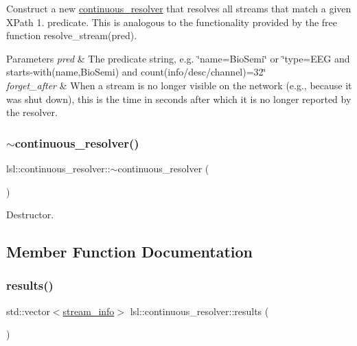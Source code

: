 Construct a new \hyperlink{classlsl_1_1continuous__resolver}{continuous\+\_\+resolver} that resolves all streams that match a given X\+Path 1. predicate. This is analogous to the functionality provided by the free function resolve\+\_\+stream(pred). 
\begin{DoxyParams}{Parameters}
{\em pred} & The predicate string, e.\+g. \char`\"{}name=\textquotesingle{}\+Bio\+Semi\textquotesingle{}\char`\"{} or \char`\"{}type=\textquotesingle{}\+E\+E\+G\textquotesingle{} and starts-\/with(name,\textquotesingle{}\+Bio\+Semi\textquotesingle{}) and count(info/desc/channel)=32\char`\"{} \\
\hline
{\em forget\+\_\+after} & When a stream is no longer visible on the network (e.\+g., because it was shut down), this is the time in seconds after which it is no longer reported by the resolver. \\
\hline
\end{DoxyParams}
\mbox{\label{classlsl_1_1continuous__resolver_a382bc439e5dbb1efcaa32def93ef01df}} 
\subsubsection{\texorpdfstring{$\sim$continuous\+\_\+resolver()}{~continuous\_resolver()}}
{\footnotesize\ttfamily lsl\+::continuous\+\_\+resolver\+::$\sim$continuous\+\_\+resolver (\begin{DoxyParamCaption}{ }\end{DoxyParamCaption})\hspace{0.3cm}{\ttfamily [inline]}}

Destructor. 

\subsection{Member Function Documentation}
\mbox{\label{classlsl_1_1continuous__resolver_ad88c16d36f8a2dc64f4ae4536445e15a}} 
\subsubsection{\texorpdfstring{results()}{results()}}
{\footnotesize\ttfamily std\+::vector$<$\hyperlink{classlsl_1_1stream__info}{stream\+\_\+info}$>$ lsl\+::continuous\+\_\+resolver\+::results (\begin{DoxyParamCaption}{ }\end{DoxyParamCaption})\hspace{0.3cm}{\ttfamily [inline]}}

